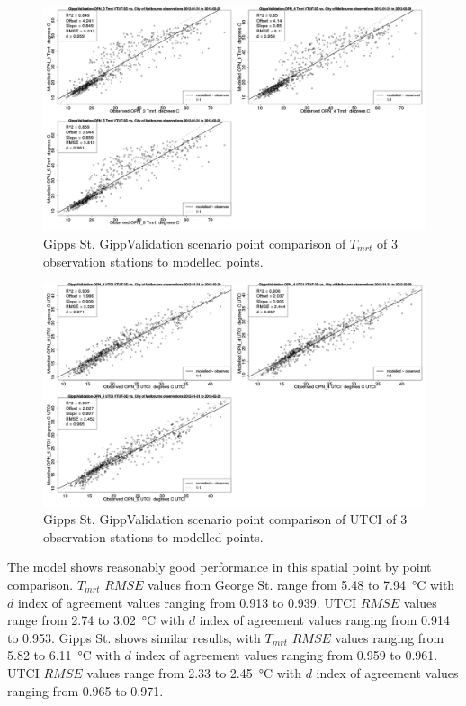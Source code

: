 \documentclass[final,3p,times,authoryear]{elsarticle}
\begin{document}
\begin{figure}[!htbp]
\includegraphics[trim = 0mm 0mm 0mm 0mm, clip, scale=0.30]{images/GippsValidation-ErrorPlots-Tmrt5.png}
\caption{Gipps St. GippValidation scenario point comparison of $T_{mrt}$ of 3 observation stations to modelled points.\label{fig:GippsStTmrtCompare}} 
\end{figure}

\begin{figure}[!htbp]
\includegraphics[trim = 0mm 0mm 0mm 0mm, clip, scale=0.30]{images/GippsValidation-ErrorPlots-UTCI5.png}
\caption{Gipps St. GippValidation scenario point comparison of UTCI of 3 observation stations to modelled points.\label{fig:GippsStUtciCompare}} 
\end{figure}

The model shows reasonably good performance in this spatial point by point comparison. $T_{mrt}$ $RMSE$ values from George St. range from 5.48 to 7.94\SI{}{\degreeCelsius} with $d$ index of agreement values ranging from 0.913 to 0.939. UTCI $RMSE$ values range from 2.74 to 3.02\SI{}{\degreeCelsius} with $d$ index of agreement values ranging from 0.914 to 0.953.  Gipps St. shows similar results, with $T_{mrt}$ $RMSE$ values ranging from 5.82 to 6.11\SI{}{\degreeCelsius} with $d$ index of agreement values ranging from 0.959 to 0.961. UTCI $RMSE$ values range from 2.33 to 2.45\SI{}{\degreeCelsius} with $d$ index of agreement values ranging from 0.965 to 0.971.
\end{document}
